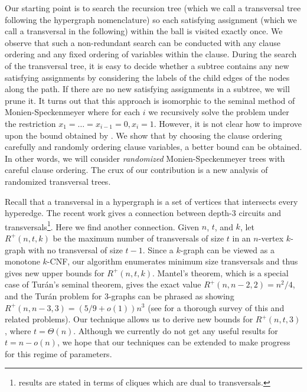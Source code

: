\bigskip
Our starting point is to search
the recursion tree 
(which we call a transversal tree following the hypergraph nomenclature) 
so each satisfying assignment (which we call a transversal in the following) within the ball is visited exactly once.
We observe that such a non-redundant search can be conducted 
with any clause ordering and any fixed ordering of variables 
within the clause. During the search of the transversal tree, 
it is easy to decide whether 
a subtree contains any new satisfying assignments by considering 
the labels of the child edges of the nodes along the path.
If there are no new satisfying assignments in a subtree,  we will prune 
it.
It turns out that this approach is isomorphic to the 
seminal method of 
Monien-Speckenmeyer \cite{MonienS85} where for each $i$ we 
recursively solve the problem under the 
restriction $x_1 = \ldots = x_{i - 1} = 0, x_i = 1$. 
However, it is not clear
how to improve 
upon the bound obtained by \cite{MonienS85}.
We show that by choosing 
the clause ordering  carefully and randomly ordering 
clause variables, a better bound can be obtained. 
In other words, we will consider 
\emph{randomized} Monien-Speckenmeyer trees with careful clause ordering.
The crux of our contribution is a  new 
analysis of randomized transversal trees.


\bigskip
{} 
Recall that a transversal in a hypergraph is a set of 
vertices that intersects every hyperedge. 
The recent work \cite{FranklGT22} gives a connection 
between depth-3 circuits and 
transversals\footnote{\cite{FranklGT22} results 
are stated in terms of cliques which are dual to transversals.}. 
Here we find 
another connection. Given $n$, $t$, and $k$, 
let $R^+(n, t, k)$ be the maximum number of 
transversals of size $t$ in an $n$-vertex $k$-graph 
with no transversal of size $t - 1$. 
Since a $k$-graph can be viewed as a monotone $k$-CNF, our algorithm 
enumerates minimum size transversals and thus gives new upper 
bounds for $R^+(n, t, k)$. 
Mantel's theorem, which is a special case of 
Tur{\'a}n's seminal theorem, gives the 
exact value $R^+(n, n - 2, 2) = n^2/4$, 
and the Tur{\'a}n problem for 
3-graphs can be phrased as 
showing $R^+(n, n - 3, 3) = (5/9 + o(1))n^3$ 
(see \cite{MR2866732} for a thorough survey of this 
and related problems). Our technique allows us to derive 
new bounds for $R^+(n, t, 3)$, 
where $t = \Theta(n)$. 
Although we currently do not get any useful results 
for  $t = n - o(n)$, we hope that our techniques can be extended to make progress for
this regime of parameters.


